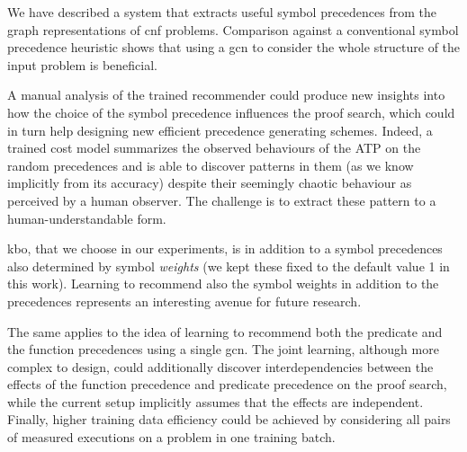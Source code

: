 We have described a system that extracts useful symbol precedences from the graph representations of \gls{cnf} problems.
Comparison against a conventional symbol precedence heuristic shows that using a \gls{gcn}
to consider the whole structure of the input problem is beneficial.

A manual analysis of the trained recommender could produce new insights into how the choice of the symbol precedence influences the proof search,
which could in turn help designing new efficient precedence generating schemes.
Indeed, a trained cost model summarizes the observed behaviours of the ATP on the random precedences
and is able to discover patterns in them (as we know implicitly from its accuracy) 
despite their seemingly chaotic behaviour as perceived by a human observer.
The challenge is to extract these pattern to a human-understandable form.

\gls{kbo}, that we choose in our experiments, is in addition to a symbol precedences
also determined by symbol \emph{weights} (we kept these fixed to the default value 1 in this work).
Learning to recommend also the symbol weights in addition to the precedences
represents an interesting avenue for future research.

The same applies to the idea of learning to recommend 
both the predicate and the function precedences using a single \gls{gcn}.
The joint learning, although more complex to design, could 
additionally discover interdependencies
between the effects of the function precedence and predicate precedence on the proof search,
while the current setup implicitly assumes that the effects are independent.
Finally, higher training data efficiency could be achieved by considering all pairs of measured executions on a problem
in one training batch.



